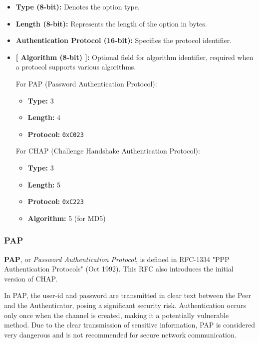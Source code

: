 \begin{itemize}
    \item \textbf{Type (8-bit):} Denotes the option type.
    \item \textbf{Length (8-bit):} Represents the length of the option in bytes.
    \item \textbf{Authentication Protocol (16-bit):} Specifies the protocol identifier.
    \item \textbf{[ Algorithm (8-bit) ]:} Optional field for algorithm identifier, required when a protocol supports various algorithms.

          For PAP (Password Authentication Protocol):
          \begin{itemize}
              \item \textbf{Type:} 3
              \item \textbf{Length:} 4
              \item \textbf{Protocol:} \texttt{0xC023}
          \end{itemize}

          For CHAP (Challenge Handshake Authentication Protocol):
          \begin{itemize}
              \item \textbf{Type:} 3
              \item \textbf{Length:} 5
              \item \textbf{Protocol:} \texttt{0xC223}
              \item \textbf{Algorithm:} 5 (for MD5)
          \end{itemize}
\end{itemize}


\subsubsection{PAP}
\textbf{PAP}, or \textit{Password Authentication Protocol}, is defined in RFC-1334 "PPP Authentication Protocols" (Oct 1992). This RFC also introduces the initial version of CHAP.

In PAP, the user-id and password are transmitted in clear text between the Peer and the Authenticator, posing a significant security risk. Authentication occurs only once when the channel is created, making it a potentially vulnerable method. Due to the clear transmission of sensitive information, PAP is considered very dangerous and is not recommended for secure network communication.

